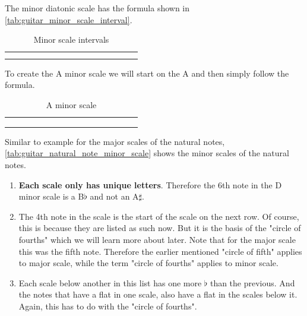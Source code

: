 The minor diatonic scale has the formula shown in \autoref{tab:guitar_minor_scale_interval}.

\begin{table}[h]
	\centering
	\begin{NiceTabular}{*{16}{P{0.05mm}}}
		\Block{}{} &  & &  & &  & &  & &  & &  & &  & & \Block{}{} \\
		 & &  & &  & &  & &  & &  & &  & &  & 
	\end{NiceTabular}
	\caption{Minor scale intervals}
	\label{tab:guitar_minor_scale_interval}
\end{table}

To create the A minor scale we will start on the A and then simply follow the formula.

\begin{table}[h]
	\centering
	\begin{NiceTabular}{*{16}{P{0.05mm}}}
		\Block{}{} &  & &  & &  & &  & &  & &  & &  & & \Block{}{} \\
		 & &  & &  & &  & &  & &  & &  & &  & \\
		 & &  & &  & &  & &  & &  & &  & &  & 
	\end{NiceTabular}
	\caption{A minor scale}
	\label{tab:guitar_a_minor_scale}
\end{table}

Similar to example for the major scales of the natural notes, \autoref{tab:guitar_natural_note_minor_scale} shows the minor scales of the natural notes.

\begin{enumerate}
	\item \textbf{Each scale only has unique letters}. Therefore the 6th note in the D minor scale is a B$\flat$ and not an A$\sharp$.
	\item The 4th note in the scale is the start of the scale on the next row. Of course, this is because they are listed as such now. But it is the basis of the "circle of fourths" which we will learn more about later. Note that for the major scale this was the fifth note. Therefore the earlier mentioned "circle of fifth" applies to major scale, while the term "circle of fourths" applies to minor scale.
	\item Each scale below another in this list has one more $\flat$ than the previous. And the notes that have a flat in one scale, also have a flat in the scales below it. Again, this has to do with the "circle of fourths".
\end{enumerate}

